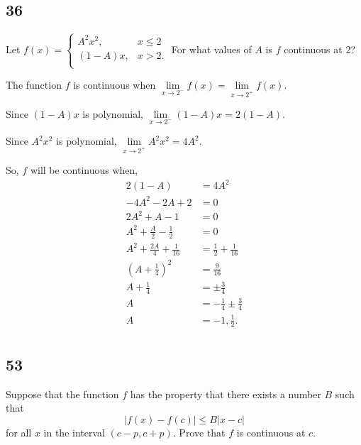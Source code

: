 \documentclass[../m134a-hw2.tex]{subfiles}
\begin{document}
\subsection*{36}
Let $f(x) = \begin{cases}
    A^2x^2, & x\leq2 \\
    (1-A)x, & x>2. \\
\end{cases}$ For what values of $A$ is $f$ continuous at 2?

The function $f$ is continuous when $\lim\limits_{x \to 2^-} f(x) = \lim\limits_{x \to 2^+} f(x) $.

Since $(1-A)x$ is polynomial, $\lim\limits_{x \to 2^-} (1-A)x = 2(1-A)$.

Since $A^2x^2$ is polynomial, $\lim\limits_{x \to 2^+} A^2x^2 = 4A^2$.

So, $f$ will be continuous when,
\begin{align*}
    2(1-A) &= 4A^2 \\
    {-4}A^2-2A+2 &= 0 \\
    2A^2+A-1 &= 0 \\
    A^2 + \frac{A}{2} - \frac{1}{2} &= 0 \\
    A^2 + \frac{2A}{4} + \frac{1}{16} &= \frac{1}{2} + \frac{1}{16} \\
    {\left(A + \frac{1}{4}\right)}^2 &= \frac{9}{16} \\
    A + \frac{1}{4} &= \pm \frac{3}{4} \\
    A &= -\frac{1}{4} \pm \frac{3}{4} \\
    A &= -1, \frac{1}{2}. \\
\end{align*}

\subsection*{53}
Suppose that the function $f$ has the property that there exists a number $B$ such that \[|f(x)-f(c)|\leq B|x-c|\] for all $x$ in the interval $(c-p,c+p)$. Prove that $f$ is continuous at $c$.
\end{document}
